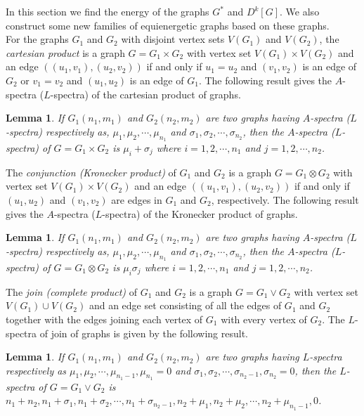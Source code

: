 \documentclass[12pt,a4paper]{amsart}
\theoremstyle{theorem}
\newtheorem{lemma}[theorem]{Lemma}
\theoremstyle{definition}
\numberwithin{equation}{section} \makeatletter
\begin{document}
In this section we find the energy of the graphs $G^*$ and $D^k[G]$. We also construct some new families of equienergetic graphs based on these graphs.\\
\indent For the graphs $G_1$ and $G_2$ with disjoint vertex sets $V(G_1)$ and $V(G_2)$, the {\it cartesian product} is a graph $G=G_1\times G_2$ with vertex set $V(G_1)\times V(G_2)$ and an edge $((u_1, v_1), (u_2, v_2))$ if and only if $u_1=u_2$ and $(v_1, v_2)$ is an edge of $G_2$ or $v_1=v_2$
and $(u_1, u_2)$ is an edge of $G_1$. The following result gives the $A$-spectra ($L$-spectra) of the cartesian product of graphs.
\begin{lemma}\cite{cds}
If $G_1(n_1,m_1)$ and $G_2(n_2,m_2)$ are two graphs having $A$-spectra ($L$-spectra) respectively as, $\mu_1, \mu_2, \cdots, \mu_{n_1}$ and $\sigma_1, \sigma_2, \cdots, \sigma_{n_2}$, then the $A$-spectra  ($L$-spectra) of $G=G_1\times G_2$ is $\mu_i+\sigma_j$ where $i=1,2,\cdots,n_1$ and $j=1,2,\cdots,n_2$.
\end{lemma}
\indent The {\it conjunction (Kronecker product)} of $G_1$ and $G_2$ is a graph $G=G_1\otimes G_2$ with vertex set $V(G_1)\times V(G_2)$ and an edge $((u_1,v_1), (u_2, v_2))$ if and only if $(u_1, u_2)$ and $(v_1, v_2)$ are edges in $G_1$ and $G_2$, respectively. The following result gives the $A$-spectra ($L$-spectra) of the Kronecker product of graphs.
\begin{lemma}\cite{cds}
If $G_1(n_1,m_1)$ and $G_2(n_2,m_2)$ are two graphs having $A$-spectra ($L$-spectra) respectively as, $\mu_1, \mu_2, \cdots, \mu_{n_1}$ and $\sigma_1, \sigma_2, \cdots, \sigma_{n_2}$, then the $A$-spectra  ($L$-spectra) of $G=G_1\otimes G_2$ is $\mu_i\sigma_j$ where $i=1,2,\cdots,n_1$ and $j=1,2,\cdots,n_2$.
\end{lemma}
\indent The {\it join (complete product)} of $G_1$ and $G_2$ is a graph $G=G_1\vee G_2$ with vertex set $V(G_1)\cup V(G_2)$ and an edge set consisting of all the edges of $G_1$ and $G_2$ together with the edges joining each vertex of $G_1$ with every vertex of $G_2$. The $L$-spectra of join of graphs is given by the following result.
\begin{lemma}\cite{cds}
If $G_1(n_1,m_1)$ and $G_2(n_2,m_2)$ are two graphs having $L$-spectra respectively as $\mu_1,\mu_2,\cdots,\mu_{n_1-1},\mu_{n_1}=0$ and $\sigma_1, \sigma_2, \cdots, \sigma_{n_2-1}, \sigma_{n_2}=0$, then the $L$-spectra of $G=G_1\vee G_2$ is $n_1+n_2, n_1+\sigma_1, n_1+\sigma_2, \cdots, n_1+\sigma_{n_2-1}, n_2+\mu_1, n_2+\mu_2, \cdots, n_2+\mu_{n_1-1}, 0$.
\end{lemma}
\end{document}
